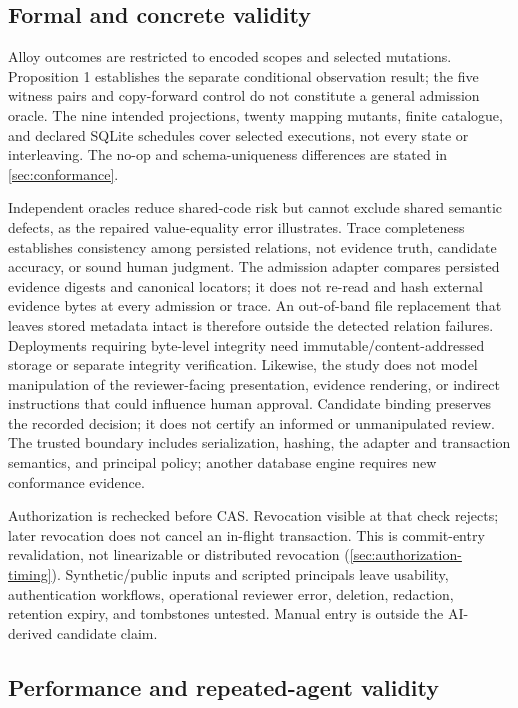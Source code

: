 \subsection{Formal and concrete validity}

Alloy outcomes are restricted to encoded scopes and selected mutations. Proposition 1 establishes the separate conditional observation result; the five witness pairs and copy-forward control do not constitute a general admission oracle. The nine intended projections, twenty mapping mutants, finite catalogue, and declared SQLite schedules cover selected executions, not every state or interleaving. The no-op and schema-uniqueness differences are stated in \cref{sec:conformance}.

Independent oracles reduce shared-code risk but cannot exclude shared semantic defects, as the repaired value-equality error illustrates. Trace completeness establishes consistency among persisted relations, not evidence truth, candidate accuracy, or sound human judgment. The admission adapter compares persisted evidence digests and canonical locators; it does not re-read and hash external evidence bytes at every admission or trace. An out-of-band file replacement that leaves stored metadata intact is therefore outside the detected relation failures. Deployments requiring byte-level integrity need immutable/content-addressed storage or separate integrity verification. Likewise, the study does not model manipulation of the reviewer-facing presentation, evidence rendering, or indirect instructions that could influence human approval. Candidate binding preserves the recorded decision; it does not certify an informed or unmanipulated review. The trusted boundary includes serialization, hashing, the adapter and transaction semantics, and principal policy; another database engine requires new conformance evidence.

Authorization is rechecked before CAS. Revocation visible at that check rejects; later revocation does not cancel an in-flight transaction. This is commit-entry revalidation, not linearizable or distributed revocation (\cref{sec:authorization-timing}). Synthetic/public inputs and scripted principals leave usability, authentication workflows, operational reviewer error, deletion, redaction, retention expiry, and tombstones untested. Manual entry is outside the AI-derived candidate claim.

\subsection{Performance and repeated-agent validity}

